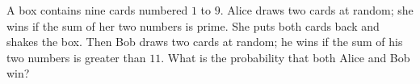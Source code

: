 A box contains nine cards numbered $1$ to $9$. Alice draws two cards at random; she wins if the sum of her two numbers is prime. She puts both cards back and shakes the box. Then Bob draws two cards at random; he wins if the sum of his two numbers is greater than $11$. What is the probability that both Alice and Bob win?
